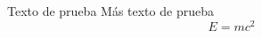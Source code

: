 \documentclass{article}
\begin{document}
\begin{tcolorbox}[title={Teoremón}]
    Texto de prueba
    \tcblower
    Más texto de prueba
    \[
    E = mc^2
    \]
\end{tcolorbox}
\end{document}
